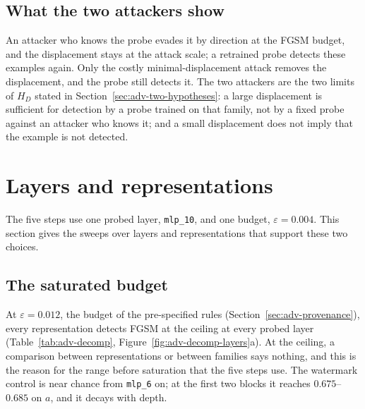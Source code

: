 \documentclass[../ppgc-tese.tex]{subfiles}
\begin{document}
\subsection{What the two attackers show}
An attacker who knows the probe evades it by direction at the FGSM budget, and
the displacement stays at the attack scale; a retrained probe detects these
examples again. Only the costly minimal-displacement attack removes the
displacement, and the probe still detects it. The two attackers are the two
limits of $H_{D}$ stated in Section~\ref{sec:adv-two-hypotheses}: a large
displacement is sufficient for detection by a probe trained on that family,
not by a fixed probe against an attacker who knows it; and a small
displacement does not imply that the example is not detected.

\section{Layers and representations}
\label{sec:adv-layers}

The five steps use one probed layer, \texttt{mlp\_10}, and one budget,
$\varepsilon{=}0.004$. This section gives the sweeps over layers and
representations that support these two choices.

\subsection{The saturated budget}
\label{sec:adv-saturated}
At $\varepsilon{=}0.012$, the budget of the pre-specified rules
(Section~\ref{sec:adv-provenance}), every representation detects FGSM at the
ceiling at every probed layer (Table~\ref{tab:adv-decomp},
Figure~\ref{fig:adv-decomp-layers}a). At the ceiling, a comparison between
representations or between families says nothing, and this is the reason for
the range before saturation that the five steps use. The watermark control is
near chance from \texttt{mlp\_6} on; at the first two blocks it reaches
$0.675$--$0.685$ on $a$, and it decays with depth.
\end{document}
